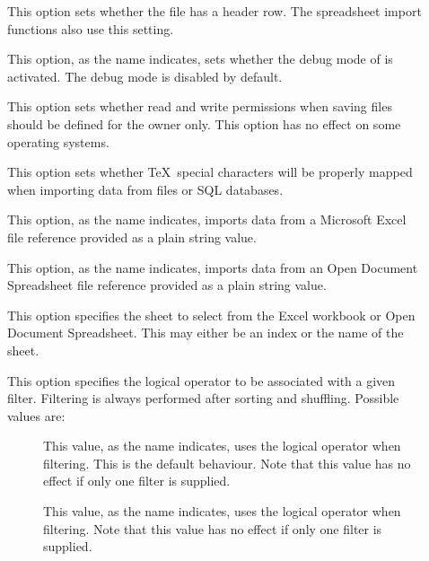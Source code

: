 \begin{description}
\begin{description}
\item[] This option sets whether the  file has a header row. The
spreadsheet import functions also use this setting.

\item[] This option, as the name indicates, sets whether the debug mode of  is activated. The debug mode is disabled by default.

\item[] This option sets whether read and write permissions when saving  files should be defined for the owner only. This option has no effect on some operating systems.

\item[] This option sets whether \TeX\ special characters will be properly mapped when importing data from  files or \gls{SQL} databases.

\item[] This option, as the name indicates, imports data from a Microsoft Excel  file reference provided as a plain string value.

\item[] This option, as the name indicates, imports data from an Open Document Spreadsheet  file reference provided as a plain string value.

\item[] This option specifies the sheet to select from the Excel workbook or Open Document Spreadsheet. This may either be an index or the name of the sheet.

\item[] This option specifies the logical operator to be associated with a given filter. Filtering is always performed after sorting and shuffling. Possible values are:

\begin{description}
\item[\hfill\hphantom{w}] This value, as the name indicates, uses the logical  operator when filtering. This is the default behaviour. Note that this value has no effect if only one filter is supplied.

\item[] This value, as the name indicates, uses the logical  operator when filtering. Note that this value has no effect if only one filter is supplied.
\end{description}


\end{description}
\end{description}
